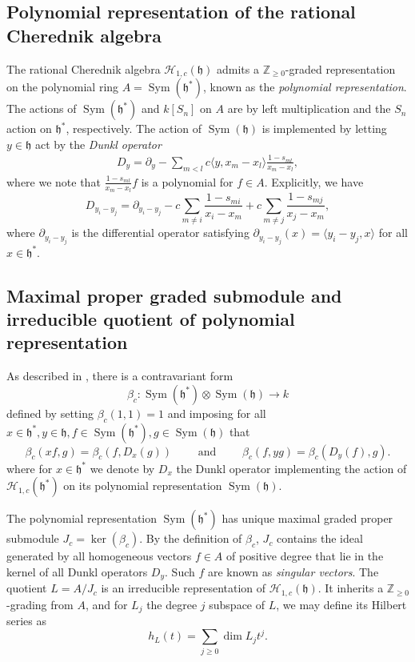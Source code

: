 \documentclass{amsart}
\numberwithin{equation}{section}
\theoremstyle{definition}
\newcommand{\ZZ}{\mathbb{Z}}
\newcommand{\h}{\mathfrak{h}}
\newcommand{\HH}{\mathcal{H}}
\newcommand{\Sym}{\operatorname{Sym}}
\begin{document}
\subsection{Polynomial representation of the rational Cherednik algebra}

The rational Cherednik algebra $\HH_{1, c}(\h)$ admits a $\ZZ_{\geq 0}$-graded representation on the polynomial ring $A = \Sym(\h^*)$, known as the \textit{polynomial representation}.  The actions of $\Sym(\h^*)$ and $k[S_n]$ on $A$ are by left multiplication and the $S_n$ action on $\h^*$, respectively.  The action of $\Sym(\h)$ is implemented by letting $y \in \h$ act by the \textit{Dunkl operator}
\begin{align*}
D_y =  \partial_y  - \sum_{m < l} c  \langle y, x_m-x_l \rangle \frac{1-s_{ml}}{x_m - x_l},
\end{align*}
where we note that $\frac{1-s_{ml}}{x_m - x_l}f$ is a polynomial for $f \in A$. Explicitly, we have  
\[
D_{y_i - y_j} =  \partial_{y_i-y_j}-c\sum_{m \ne i} \frac{1-s_{mi}}{x_i-x_m}+c\sum_{m \ne j} \frac{1-s_{mj}}{x_j-x_m},
\] \noindent
where $\partial_{y_i-y_j}$ is the differential operator satisfying $\partial_{y_i-y_j}(x) = \langle y_i-y_j,x\rangle$ for all $x \in \h^*$.  

\subsection{Maximal proper graded submodule and irreducible quotient of polynomial representation}

As described in \cite[Section 2.5]{BC1}, there is a contravariant form 
\[
\beta_c: \Sym(\h^*) \otimes \Sym(\h) \to k
\]
defined by setting $\beta_c(1, 1) = 1$ and imposing for all $x \in \h^*, y \in \h, f \in \Sym(\h^*), g \in \Sym(\h)$ that
\[
\beta_c(xf,g)=\beta_c(f,D_x(g)) \qquad \text{ and } \qquad \beta_c(f,yg) = \beta_c(D_y(f),g).
\]
where for $x \in \h^*$ we denote by $D_x$ the Dunkl operator implementing the action of $\HH_{1, c}(\h^*)$ on its polynomial representation $\Sym(\h)$. 

The polynomial representation $\Sym(\h^*)$ has unique maximal graded proper submodule $J_c = \ker(\beta_c)$.  By the definition of $\beta_c$, $J_c$ contains the ideal generated by all homogeneous vectors $f \in A$ of positive degree that lie in the kernel of all Dunkl operators $D_y$.  Such $f$ are known as \textit{singular vectors}.  The quotient $L = A/J_c$ is an irreducible representation of $\HH_{1,c}(\h)$.  It inherits a $\ZZ_{\geq 0}$-grading from $A$, and for $L_j$ the degree $j$ subspace of $L$, we may define its Hilbert series as
\[
h_L(t) = \sum_{j \geq 0} \dim L_j t^j.
\]
\end{document}
